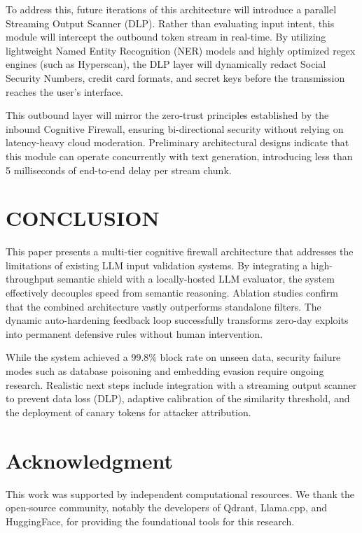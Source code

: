 \documentclass[10pt, conference]{IEEEtran}
\begin{document}
To address this, future iterations of this architecture will introduce a parallel Streaming Output Scanner (DLP). Rather than evaluating input intent, this module will intercept the outbound token stream in real-time. By utilizing lightweight Named Entity Recognition (NER) models and highly optimized regex engines (such as Hyperscan), the DLP layer will dynamically redact Social Security Numbers, credit card formats, and secret keys before the transmission reaches the user's interface. 

This outbound layer will mirror the zero-trust principles established by the inbound Cognitive Firewall, ensuring bi-directional security without relying on latency-heavy cloud moderation. Preliminary architectural designs indicate that this module can operate concurrently with text generation, introducing less than 5 milliseconds of end-to-end delay per stream chunk.

\section{CONCLUSION}
This paper presents a multi-tier cognitive firewall architecture that addresses the limitations of existing LLM input validation systems. By integrating a high-throughput semantic shield with a locally-hosted LLM evaluator, the system effectively decouples speed from semantic reasoning. Ablation studies confirm that the combined architecture vastly outperforms standalone filters. The dynamic auto-hardening feedback loop successfully transforms zero-day exploits into permanent defensive rules without human intervention. 

While the system achieved a 99.8\% block rate on unseen data, security failure modes such as database poisoning and embedding evasion require ongoing research. Realistic next steps include integration with a streaming output scanner to prevent data loss (DLP), adaptive calibration of the similarity threshold, and the deployment of canary tokens for attacker attribution.

\section*{Acknowledgment}
This work was supported by independent computational resources. We thank the open-source community, notably the developers of Qdrant, Llama.cpp, and HuggingFace, for providing the foundational tools for this research.



\end{document}
